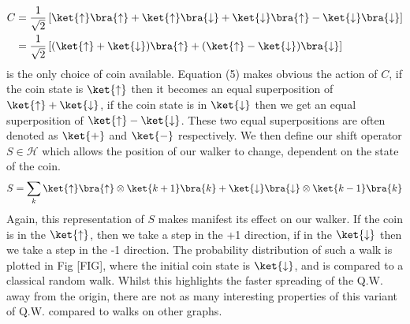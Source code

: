 \begin{align}
    C &= \frac{1}{\sqrt{2}}\left[
    \ket{\uparrow}\bra{\uparrow} +
    \ket{\uparrow}\bra{\downarrow} +
    \ket{\downarrow}\bra{\uparrow} -
    \ket{\downarrow}\bra{\downarrow}\right]\\
    &= \frac{1}{\sqrt{2}}\left[(\ket{\uparrow} + \ket{\downarrow})\bra{\uparrow} +
    (\ket{\uparrow} - \ket{\downarrow})\bra{\downarrow}\right]
\end{align}
is the only choice of coin available. 
Equation (5) makes obvious the action of $C$, if the coin state is $\ket{\uparrow}$ then it becomes an equal superposition of $\ket{\uparrow} + \ket{\downarrow}$, if the coin state is in $\ket{\downarrow}$ then we get an equal superposition of $\ket{\uparrow} - \ket{\downarrow}$. 
These two equal superpositions are often denoted as $\ket{+}$ and $\ket{-}$ respectively.\newline
We then define our shift operator $S \in \mathcal{H}$ which allows the position of our walker to change, dependent on the state of the coin.
\begin{equation}
    S = \sum_k \ket{\uparrow}\bra{\uparrow} \otimes \ket{k + 1}\bra{k} + \ket{\downarrow}\bra{\downarrow} \otimes \ket{k - 1}\bra{k}
\end{equation}
Again, this representation of $S$ makes manifest its effect on our walker. 
If the coin is in the $\ket{\uparrow}$, then we take a step in the +1 direction, if in the $\ket{\downarrow}$ then we take a step in the -1 direction. 
The probability distribution of such a walk is plotted in Fig [FIG], where the initial coin state is $\ket{\downarrow}$, and is compared to a classical random walk. Whilst this highlights the faster spreading of the Q.W. away from the origin, there are not as many interesting properties of this variant of Q.W. compared to walks on other graphs.
